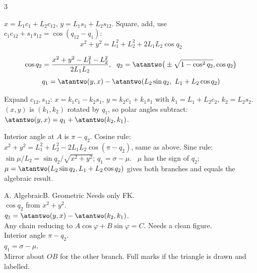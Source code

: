 \begin{multicols}{3}
\begin{deriv}
$x=L_1c_1+L_2c_{12}$, $y=L_1s_1+L_2s_{12}$. Square, add, use $c_1c_{12}+s_1s_{12}=\cos(q_{12}-q_1)$:
\[x^2+y^2=L_1^2+L_2^2+2L_1L_2\cos q_2\]
\end{deriv}
\begin{fbx}[Planar RR \pg{28,30}]
\[\cos q_2=\frac{x^2+y^2-L_1^2-L_2^2}{2L_1L_2},\ \ q_2=\atantwo\big(\pm\sqrt{1-\cos^2q_2},\cos q_2\big)\]
\[q_1=\atantwo(y,x)-\atantwo(L_2\sin q_2,\ L_1+L_2\cos q_2)\]
\end{fbx}
\begin{deriv}
Expand $c_{12},s_{12}$: $x=k_1c_1-k_2s_1$, $y=k_2c_1+k_1s_1$ with $k_1=L_1+L_2c_2$, $k_2=L_2s_2$. $(x,y)$ is $(k_1,k_2)$ rotated by $q_1$, so polar angles subtract: $\atantwo(y,x)=q_1+\atantwo(k_2,k_1)$.
\end{deriv}
\begin{deriv}
Interior angle at $A$ is $\pi-q_2$. Cosine rule: $x^2+y^2=L_1^2+L_2^2-2L_1L_2\cos(\pi-q_2)$, same as above. Sine rule: $\sin\mu/L_2=\sin q_2/\sqrt{x^2+y^2}$; $q_1=\sigma-\mu$. \added\ $\mu$ has the sign of $q_2$; $\mu=\atantwo(L_2\sin q_2,L_1+L_2\cos q_2)$ gives both branches and equals the algebraic result.
\end{deriv}
\begin{twoway}{A. Algebraic}{B. Geometric}
Needs only FK.\\
$\cos q_2$ from $x^2+y^2$.\\
$q_1=\atantwo(y,x)-\atantwo(k_2,k_1)$.\\
Any chain reducing to $A\cos\varphi+B\sin\varphi=C$.
\tcblower
Needs a clean figure.\\
Interior angle $\pi-q_2$.\\
$q_1=\sigma-\mu$.\\
Mirror about $OB$ for the other branch. Full marks if the triangle is drawn and labelled.
\end{twoway}
\begin{slideerr}[$\tan^{-1}$ on pp.\,24, 30; W13 p.\,7]

\end{slideerr}
\end{multicols}

